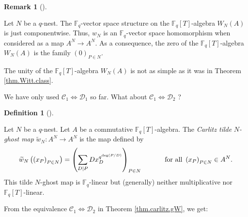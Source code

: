 \documentclass[numbers=enddot,12pt,final,onecolumn,notitlepage]{scrartcl}%
\theoremstyle{definition}
\newtheorem{defi}[theo]{Definition}
\newenvironment{definition}[1][]
{\begin{defi}[#1]\begin{leftbar}}
{\end{leftbar}\end{defi}}
\newtheorem{remk}[theo]{Remark}
\newenvironment{remark}[1][]
{\begin{remk}[#1]\begin{leftbar}}
{\end{leftbar}\end{remk}}
\let\sumnonlimits\sum
\renewcommand{\sum}{\sumnonlimits\limits}
\begin{document}
\begin{remark}
Let $N$ be a $q$-nest. The $\mathbb{F}_{q}$-vector space structure on the
$\mathbb{F}_{q}\left[  T\right]  $-algebra $W_{N}\left(  A\right)  $ is just
componentwise. Thus, $w_{N}$ is an $\mathbb{F}_{q}$-vector space homomorphism
when considered as a map $A^{N}\rightarrow A^{N}$. As a consequence, the zero
of the $\mathbb{F}_{q}\left[  T\right]  $-algebra $W_{N}\left(  A\right)  $ is
the family $\left(  0\right)  _{P\in N}$.
\end{remark}

The unity of the $\mathbb{F}_{q}\left[  T\right]  $-algebra $W_{N}\left(
A\right)  $ is not as simple as it was in Theorem \ref{thm.Witt.class}.

We have only used $\mathcal{C}_{1}\Longleftrightarrow\mathcal{D}_{1}$ so far.
What about $\mathcal{C}_{1}\Longleftrightarrow\mathcal{D}_{2}$ ?

\begin{definition}
\label{def.carlitz.Witt.ghostmap.tilde}Let $N$ be a $q$-nest. Let $A$ be a
commutative $\mathbb{F}_{q}\left[  T\right]  $-algebra. The \textit{Carlitz
tilde }$N$\textit{-ghost map} $\widetilde{w}_{N}:A^{N}\rightarrow A^{N}$ is
the map defined by%
\[
\widetilde{w}_{N}\left(  \left(  x_{P}\right)  _{P\in N}\right)  =\left(
\sum\limits_{D\mid P}Dx_{D}^{q^{\deg\left(  P / D\right)  }}\right)  _{P\in
N}\ \ \ \ \ \ \ \ \ \ \text{for all }\left(  x_{P}\right)  _{P\in N}\in
A^{N}.
\]
This tilde $N$-ghost map is $\mathbb{F}_{q}$-linear but (generally) neither
multiplicative nor $\mathbb{F}_{q}\left[  T\right]  $-linear.
\end{definition}

From the equivalence $\mathcal{C}_{1}\Longleftrightarrow\mathcal{D}_{2}$ in
Theorem \ref{thm.carlitz.gW}, we get:
\end{document}
